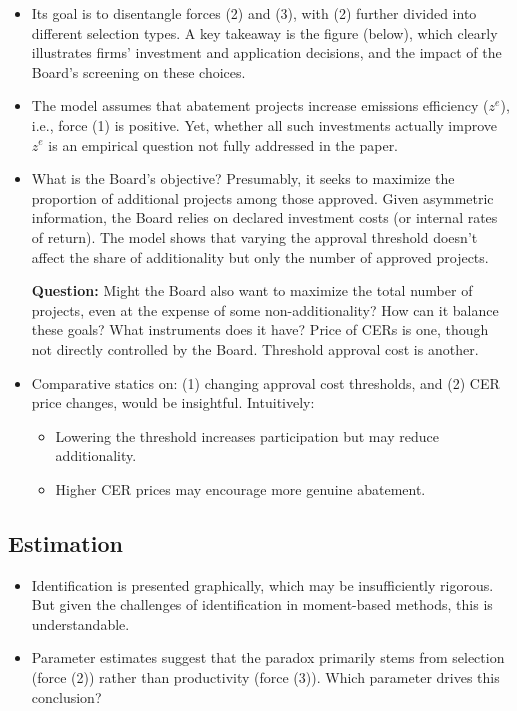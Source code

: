 \documentclass[12pt]{article}[margin=1in]
\begin{document}
\begin{itemize}
    \item Its goal is to disentangle forces (2) and (3), with (2) further divided into different selection types. A key takeaway is the figure (below), which clearly illustrates firms’ investment and application decisions, and the impact of the Board’s screening on these choices.
    \item The model assumes that abatement projects increase emissions efficiency ($z^e$), i.e., force (1) is positive. Yet, whether all such investments actually improve $z^e$ is an empirical question not fully addressed in the paper.
    \item What is the Board’s objective? Presumably, it seeks to maximize the proportion of additional projects among those approved. Given asymmetric information, the Board relies on declared investment costs (or internal rates of return). The model shows that varying the approval threshold doesn’t affect the share of additionality but only the number of approved projects.

          \textbf{Question:} Might the Board also want to maximize the total number of projects, even at the expense of some non-additionality? How can it balance these goals? What instruments does it have? Price of CERs is one, though not directly controlled by the Board. Threshold approval cost is another.
    \item Comparative statics on: (1) changing approval cost thresholds, and (2) CER price changes, would be insightful. Intuitively:
          \begin{itemize}
              \item Lowering the threshold increases participation but may reduce additionality.
              \item Higher CER prices may encourage more genuine abatement.
          \end{itemize}
\end{itemize}

\subsection*{Estimation}

\begin{itemize}
    \item Identification is presented graphically, which may be insufficiently rigorous. But given the challenges of identification in moment-based methods, this is understandable.
    \item Parameter estimates suggest that the paradox primarily stems from selection (force (2)) rather than productivity (force (3)). Which parameter drives this conclusion?
\end{itemize}
\end{document}
